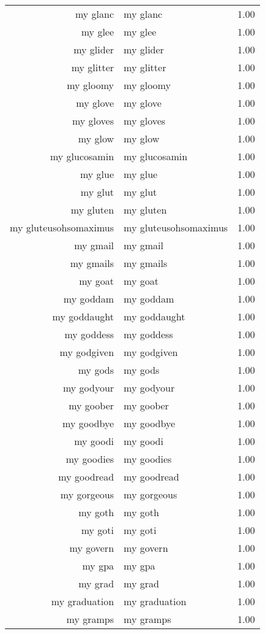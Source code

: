 \begin{table}[ht]
\begin{tabular}{rlr}
  my glanc & my glanc & 1.00 \\ 
  my glee & my glee & 1.00 \\ 
  my glider & my glider & 1.00 \\ 
  my glitter & my glitter & 1.00 \\ 
  my gloomy & my gloomy & 1.00 \\ 
  my glove & my glove & 1.00 \\ 
  my gloves & my gloves & 1.00 \\ 
  my glow & my glow & 1.00 \\ 
  my glucosamin & my glucosamin & 1.00 \\ 
  my glue & my glue & 1.00 \\ 
  my glut & my glut & 1.00 \\ 
  my gluten & my gluten & 1.00 \\ 
  my gluteusohsomaximus & my gluteusohsomaximus & 1.00 \\ 
  my gmail & my gmail & 1.00 \\ 
  my gmails & my gmails & 1.00 \\ 
  my goat & my goat & 1.00 \\ 
  my goddam & my goddam & 1.00 \\ 
  my goddaught & my goddaught & 1.00 \\ 
  my goddess & my goddess & 1.00 \\ 
  my godgiven & my godgiven & 1.00 \\ 
  my gods & my gods & 1.00 \\ 
  my godyour & my godyour & 1.00 \\ 
  my goober & my goober & 1.00 \\ 
  my goodbye & my goodbye & 1.00 \\ 
  my goodi & my goodi & 1.00 \\ 
  my goodies & my goodies & 1.00 \\ 
  my goodread & my goodread & 1.00 \\ 
  my gorgeous & my gorgeous & 1.00 \\ 
  my goth & my goth & 1.00 \\ 
  my goti & my goti & 1.00 \\ 
  my govern & my govern & 1.00 \\ 
  my gpa & my gpa & 1.00 \\ 
  my grad & my grad & 1.00 \\ 
  my graduation & my graduation & 1.00 \\ 
  my gramps & my gramps & 1.00 \\ 

\end{tabular}
\end{table}
